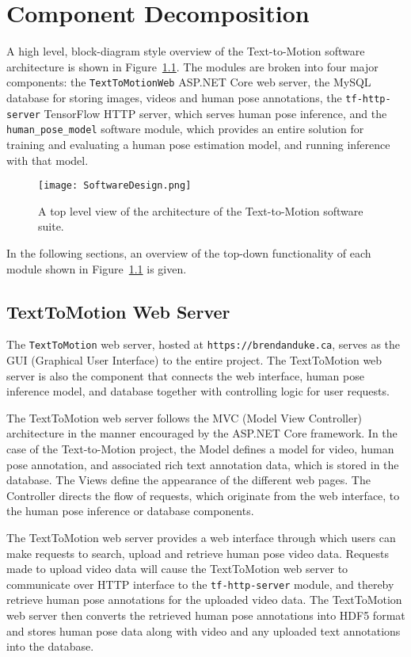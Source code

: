 \documentclass{scrreprt}
\begin{document}
\chapter{Component Decomposition}

A high level, block-diagram style overview of the Text-to-Motion software
architecture is shown in Figure~\ref{texttomotion_toplevel}. The modules are
broken into four major components: the \verb|TextToMotionWeb| ASP.NET Core web
server, the MySQL database for storing images, videos and human pose
annotations, the \verb|tf-http-server| TensorFlow HTTP server, which serves
human pose inference, and the \verb|human_pose_model| software module, which
provides an entire solution for training and evaluating a human pose estimation
model, and running inference with that model.

\begin{figure}[!ht]
        \centering
        \caption{A top level view of the architecture of the Text-to-Motion
                 software suite.}
        \texttt{[image: SoftwareDesign.png]}
        \label{texttomotion_toplevel}
\end{figure}

In the following sections, an overview of the top-down functionality of each
module shown in Figure~\ref{texttomotion_toplevel} is given.

\section{TextToMotion Web Server}

The \verb|TextToMotion| web server, hosted at \verb|https://brendanduke.ca|,
serves as the GUI (Graphical User Interface) to the entire project. The
TextToMotion web server is also the component that connects the web interface,
human pose inference model, and database together with controlling logic for
user requests.

The TextToMotion web server follows the MVC (Model View Controller)
architecture in the manner encouraged by the ASP.NET Core framework. In the
case of the Text-to-Motion project, the Model defines a model for video, human
pose annotation, and associated rich text annotation data, which is stored in
the database. The Views define the appearance of the different web pages. The
Controller directs the flow of requests, which originate from the web
interface, to the human pose inference or database components.

The TextToMotion web server provides a web interface through which users can
make requests to search, upload and retrieve human pose video data. Requests
made to upload video data will cause the TextToMotion web server to communicate
over HTTP interface to the \verb|tf-http-server| module, and thereby retrieve
human pose annotations for the uploaded video data. The TextToMotion web server
then converts the retrieved human pose annotations into HDF5 format and stores
human pose data along with video and any uploaded text annotations into the
database.
\end{document}
